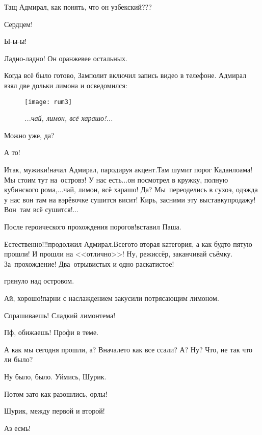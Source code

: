 \diagdash Тащ Адмирал, как понять, что он узбекский???

\diagdash Сердцем!

\diagdash Ы-ы-ы!

\diagdash Ладно-ладно! Он оранжевее остальных.

Когда всё было готово, Замполит включил запись видео в телефоне. Адмирал взял две дольки лимона и осведомился:

\begin{wrapfigure}[17]{r}{0.5\textwidth}
	\centering
	\texttt{[image: rum3]}
	\caption{\small\textit{...чай, лимон, всё харашо!...}}
\end{wrapfigure}
\diagdash Можно уже, да?

\diagdash А то!

\diagdash Итак, мужики!\mdash начал Адмирал, пародируя акцент.\mdash Там шумит порог Каданлоама! Мы стоим тут на~островэ! У нас есть$\ldots$\mdash он посмотрел в кружку, полную кубинского рома,\mdash $\ldots$чай, лимон, всё харашо! Да? Мы~переоделись в сухоэ, одэжда у нас вон там на вэрёвочке сушится висит! Кирь, засними эту выставку\sdash продажу! Вон~там всё сушится!$\ldots$


\diagdash После героического прохождения порогов!\mdash вставил Паша.

\diagdash Естественно!!!\mdash продолжил Адмирал.\mdash Всего\sdash то вторая категория, а как будто пятую прошли! И прошли на <<отлично>>! Ну, режиссёр, заканчивай съёмку. За~прохождение! Два~отрывистых и одно раскатистое!

\mdash грянуло над островом.

\diagdash Ай, хорошо!\mdash парни с наслаждением закусили потрясающим лимоном.

\diagdash Спрашиваешь! Сладкий лимон\mdash тема!

\diagdash Пф, обижаешь! Профи в теме.

\diagdash А как мы сегодня прошли, а? Вначале\sdash то как все ссали? А? Ну? Что, не так что ли было?

\diagdash Ну было, было. Уймись, Шурик.

\diagdash Потом зато как разошлись, орлы!

\diagdash Шурик, между первой и второй!

\diagdash Аз есмь!


